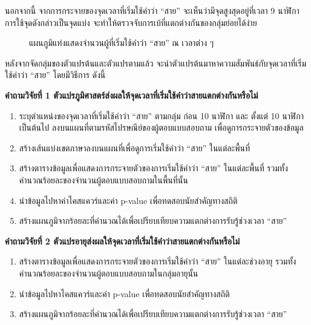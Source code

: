 \documentclass[a4paper]{article}
\begin{document}
    นอกจากนี้ จากการกระจายของจุดเวลาที่เริ่มใช้คำว่า “สาย” จะเห็นว่ามีจุดสูงสุดอยู่ที่เวลา 9 นาฬิกา การใช้จุดดังกล่าวเป็นจุดแบ่ง จะทำให้ตรวจจับการเบ้ที่แตกต่างกันของกลุ่มย่อยได้ง่าย
    \begin{figure}[!ht]
        \begin{center}
        \end{center}
        \caption{แผนภูมิแท่งแสดงจำนวนผู้ที่เริ่มใช้คำว่า “สาย” ณ เวลาต่าง ๆ}
    \end{figure}
    \newpage

    หลังจากจัดกลุ่มของตัวแปรต้นและตัวแปรตามแล้ว จะนำตัวแปรต้นมาหาความสัมพันธ์กับจุดเวลาที่เริ่มใช้คำว่า “สาย” โดยมีวิธีการ ดังนี้

    \textbf{คำถามวิจัยที่ 1 ตัวแปรภูมิศาสตร์ส่งผลให้จุดเวลาที่เริ่มใช้คำว่าสายแตกต่างกันหรือไม่}
    \begin{enumerate}
        \item ระบุตำแหน่งของจุดเวลาที่เริ่มใช้คำว่า “สาย” ตามกลุ่ม ก่อน 10 นาฬิกา และ ตั้งแต่ 10 นาฬิกาเป็นต้นไป ลงบนแผนที่ตามรหัสไปรษณีย์ของผู้ตอบแบบสอบถาม เพื่อดูการกระจายตัวของข้อมูล
        \item สร้างเส้นแบ่งเขตภาษาลงบนแผนที่เพื่อดูการเริ่มใช้คำว่า “สาย” ในแต่ละพื้นที่
        \item สร้างตารางข้อมูลเพื่อแสดงการกระจายตัวของการเริ่มใช้คำว่า “สาย” ในแต่ละพื้นที่ รวมทั้งคำนวณร้อยละของจำนวนผู้ตอบแบบสอบถามในพื้นที่นั้น
        \item นำข้อมูลไปหาค่าไคสแควร์และค่า p-value เพื่อทดสอบนัยสำคัญทางสถิติ
        \item สร้างแผนภูมิจากร้อยละที่คำนวณได้เพื่อเปรียบเทียบความแตกต่างการรับรู้ช่วงเวลา “สาย”
    \end{enumerate}

    \textbf{คำถามวิจัยที่ 2 ตัวแปรอายุส่งผลให้จุดเวลาที่เริ่มใช้คำว่าสายแตกต่างกันหรือไม่}
    \begin{enumerate}
        \item สร้างตารางข้อมูลเพื่อแสดงการกระจายตัวของการเริ่มใช้คำว่า “สาย” ในแต่ละช่วงอายุ รวมทั้งคำนวณร้อยละของจำนวนผู้ตอบแบบสอบถามในกลุ่มอายุนั้น
        \item นำข้อมูลไปหาไคสแควร์และค่า p-value เพื่อทดสอบนัยสำคัญทางสถิติ
        \item สร้างแผนภูมิจากร้อยละที่คำนวณได้เพื่อเปรียบเทียบความแตกต่างการรับรู้ช่วงเวลา “สาย”
    \end{enumerate}
\end{document}
